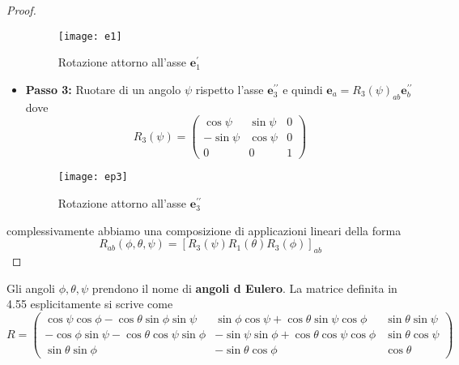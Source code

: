 \begin{proof}
\begin{itemize}
\begin{figure}[ht]
\vspace{0.1in}
\texttt{[image: e1]}	
\centering
\vspace{0.1in}
\caption{Rotazione attorno all'asse $\bm{e}_{1}^{\prime}$}
\end{figure}

\item \textbf{Passo 3:} Ruotare di un angolo $\psi$ rispetto l'asse $\bm{e}_{3}^{\prime \prime}$ e quindi $\bm{e}_{a} = R_3(\psi)_{ab}\bm{e}_{b}^{\prime \prime}$ dove
\begin{equation*}
R_3(\psi)=\left(\begin{array}{ccc}
\cos \psi & \sin \psi & 0 \\
-\sin \psi & \cos \psi & 0 \\
0 & 0 & 1
\end{array}\right)
\end{equation*}

\begin{figure}[ht]
\vspace{0.1in}
\texttt{[image: ep3]}	
\centering
\vspace{0.1in}
\caption{Rotazione attorno all'asse $\bm{e}_{3}^{\prime \prime }$}
\end{figure}

\end{itemize}
complessivamente abbiamo una composizione di applicazioni lineari della forma 
\begin{equation}
R_{a b}(\phi, \theta, \psi)=\left[R_3(\psi) R_1(\theta) R_3(\phi)\right]_{a b}
\end{equation}
\end{proof}
 
Gli angoli $\phi,\theta, \psi$ prendono il nome di \textbf{angoli d Eulero}. La matrice definita in 4.55 esplicitamente si scrive come 
\begin{equation*}
R=\left(\begin{array}{ccc}
\cos \psi \cos \phi-\cos \theta \sin \phi \sin \psi & \sin \phi \cos \psi+\cos \theta \sin \psi \cos \phi & \sin \theta \sin \psi \\
-\cos \phi \sin \psi-\cos \theta \cos \psi \sin \phi & -\sin \psi \sin \phi+\cos \theta \cos \psi \cos \phi & \sin \theta \cos \psi \\
\sin \theta \sin \phi & -\sin \theta \cos \phi & \cos \theta
\end{array}\right)
\end{equation*}
\newpage

